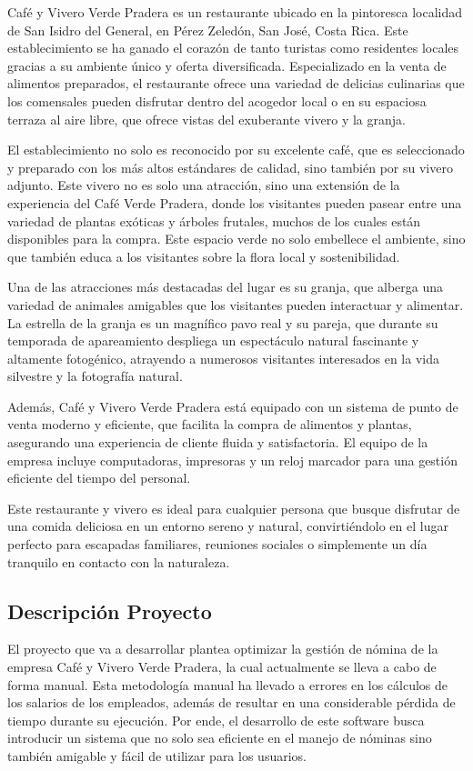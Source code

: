 Café y Vivero Verde Pradera es un restaurante ubicado en la pintoresca localidad de
San Isidro del General, en Pérez Zeledón, San José, Costa Rica. Este establecimiento
se ha ganado el corazón de tanto turistas como residentes locales gracias a su ambiente
único y oferta diversificada. Especializado en la venta de alimentos preparados, el restaurante
ofrece una variedad de delicias culinarias que los comensales pueden disfrutar dentro del acogedor
local o en su espaciosa terraza al aire libre, que ofrece vistas del exuberante vivero y la granja.

El establecimiento no solo es reconocido por su excelente café, que es seleccionado y
preparado con los más altos estándares de calidad, sino también por su vivero adjunto.
Este vivero no es solo una atracción, sino una extensión de la experiencia del Café Verde Pradera,
donde los visitantes pueden pasear entre una variedad de plantas exóticas y árboles frutales, muchos
de los cuales están disponibles para la compra. Este espacio verde no solo embellece el ambiente, sino
que también educa a los visitantes sobre la flora local y sostenibilidad.

Una de las atracciones más destacadas del lugar es su granja, que alberga una variedad de animales
amigables que los visitantes pueden interactuar y alimentar. La estrella de la granja es un magnífico
pavo real y su pareja, que durante su temporada de apareamiento despliega un espectáculo natural
fascinante y altamente fotogénico, atrayendo a numerosos visitantes interesados en la vida silvestre y
la fotografía natural.

Además, Café y Vivero Verde Pradera está equipado con un sistema de punto de venta moderno y eficiente,
que facilita la compra de alimentos y plantas, asegurando una experiencia de cliente fluida y
satisfactoria. El equipo de la empresa incluye computadoras, impresoras y un reloj marcador
para una gestión eficiente del tiempo del personal.

Este restaurante y vivero es ideal para cualquier persona que busque disfrutar de una
comida deliciosa en un entorno sereno y natural, convirtiéndolo en el lugar perfecto para
escapadas familiares, reuniones sociales o simplemente un día tranquilo en contacto con la naturaleza.

\subsection{Descripción Proyecto}

El proyecto que va a desarrollar plantea optimizar
la gestión de nómina de la empresa Café y Vivero Verde Pradera, la cual actualmente
se lleva a cabo de forma manual. Esta metodología manual ha llevado a errores en los
cálculos de los salarios de los empleados, además de resultar en una considerable pérdida
de tiempo durante su ejecución. Por ende, el desarrollo de este software busca introducir
un sistema que no solo sea eficiente en el manejo de nóminas sino también amigable y fácil
de utilizar para los usuarios.

